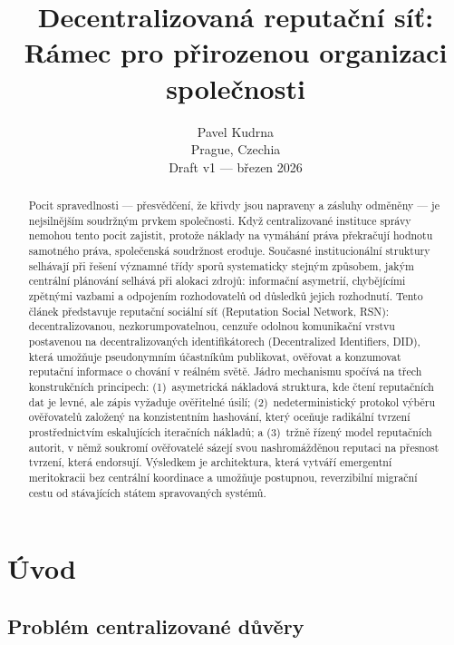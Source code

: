 \documentclass[11pt,a4paper,twocolumn]{article}
\title{\textbf{Decentralizovaná reputační síť:\\Rámec pro přirozenou organizaci společnosti}}
\author{Pavel Kudrna\\Prague, Czechia\\Draft v1 --- březen 2026}
\date{}
\begin{document}
\maketitle

\begin{abstract}
Pocit spravedlnosti --- přesvědčení, že křivdy jsou napraveny a zásluhy odměněny --- je nejsilnějším soudržným prvkem společnosti. Když centralizované instituce správy nemohou tento pocit zajistit, protože náklady na vymáhání práva překračují hodnotu samotného práva, společenská soudržnost eroduje. Současné institucionální struktury selhávají při řešení významné třídy sporů systematicky stejným způsobem, jakým centrální plánování selhává při alokaci zdrojů: informační asymetrií, chybějícími zpětnými vazbami a odpojením rozhodovatelů od důsledků jejich rozhodnutí. Tento článek představuje reputační sociální síť (Reputation Social Network, RSN): decentralizovanou, nezkorumpovatelnou, cenzuře odolnou komunikační vrstvu postavenou na decentralizovaných identifikátorech (Decentralized Identifiers, DID), která umožňuje pseudonymním účastníkům publikovat, ověřovat a konzumovat reputační informace o chování v reálném světě. Jádro mechanismu spočívá na třech konstrukčních principech: (1)~asymetrická nákladová struktura, kde čtení reputačních dat je levné, ale zápis vyžaduje ověřitelné úsilí; (2)~nedeterministický protokol výběru ověřovatelů založený na konzistentním hashování, který oceňuje radikální tvrzení prostřednictvím eskalujících iteračních nákladů; a (3)~tržně řízený model reputačních autorit, v němž soukromí ověřovatelé sázejí svou nashromážděnou reputaci na přesnost tvrzení, která endorsují. Výsledkem je architektura, která vytváří emergentní meritokracii bez centrální koordinace a umožňuje postupnou, reverzibilní migrační cestu od stávajících státem spravovaných systémů.
\end{abstract}

\section{Úvod}

\subsection{Problém centralizované důvěry}
\end{document}
